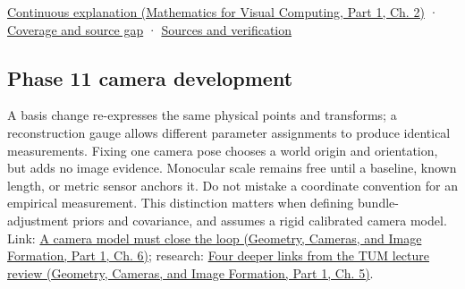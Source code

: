 \hypertarget{appendix-1bae9457dbc3-source-and-navigation}{}

\href{../02-Mathematics-for-Visual-Computing-P01/main.pdf\#01-foundations-i-ch018-keep-the-promises-visible-while-moving-between-representations}{Continuous explanation (Mathematics for Visual Computing, Part 1, Ch. 2)} · \hyperref[appendix-fd090d982a15-phase-7---parts-601-700]{Coverage and source gap} · \hyperref[appendix-a103e7846d21-phase-7---source-analysis-and-verification]{Sources and verification}

\subsection{Phase 11 camera development}\label{appendix-1bae9457dbc3-phase-11-camera-development}

\hypertarget{appendix-1bae9457dbc3-phase-11-camera-development}{}

A basis change re-expresses the same physical points and transforms; a reconstruction gauge allows different parameter assignments to produce identical measurements. Fixing one camera pose chooses a world origin and orientation, but adds no image evidence. Monocular scale remains free until a baseline, known length, or metric sensor anchors it. Do not mistake a coordinate convention for an empirical measurement. This distinction matters when defining bundle-adjustment priors and covariance, and assumes a rigid calibrated camera model. Link: \href{../03-Geometry-Cameras-and-Image-Formation-P01/main.pdf\#02-foundations-ii-ch037-a-camera-model-must-close-the-loop}{A camera model must close the loop (Geometry, Cameras, and Image Formation, Part 1, Ch. 6)}; research: \href{../03-Geometry-Cameras-and-Image-Formation-P01/main.pdf\#02-foundations-ii-ch036-four-deeper-links-from-the-tum-lecture-review}{Four deeper links from the TUM lecture review (Geometry, Cameras, and Image Formation, Part 1, Ch. 5)}.
